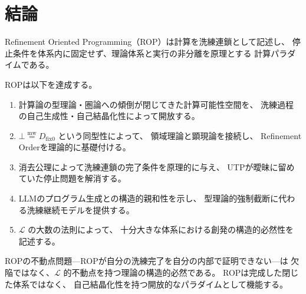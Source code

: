 \documentclass[11pt,a4paper]{article}
\theoremstyle{definition}
\newcommand{\mweq}{\mathrel{\overset{\mathrm{mw}}{=}}}
\newcommand{\dfix}{D_{\mathrm{fix}0}}
\newcommand{\Lhagma}{\mathcal{L}}
\begin{document}
\section{結論}

Refinement Oriented Programming（ROP）は計算を洗練連鎖として記述し、
停止条件を体系内に固定せず、理論体系と実行の非分離を原理とする
計算パラダイムである。

ROPは以下を達成する。

\begin{enumerate}
  \item 計算論の型理論・圏論への傾倒が閉じてきた計算可能性空間を、
    洗練過程の自己生成性・自己結晶化性によって開放する。
  
  \item $\bot \mweq \dfix$ という同型性によって、
    領域理論と顕現論を接続し、
    Refinement Orderを理論的に基礎付ける。
  
  \item 消去公理によって洗練連鎖の完了条件を原理的に与え、
    UTPが曖昧に留めていた停止問題を解消する。
  
  \item LLMのプログラム生成との構造的親和性を示し、
    型理論的強制截断に代わる洗練継続モデルを提供する。
  
  \item $\Lhagma$ の大数の法則によって、
    十分大きな体系における創発の構造的必然性を記述する。
\end{enumerate}

ROPの不動点問題---ROPが自分の洗練完了を自分の内部で証明できない---は
欠陥ではなく、$\Lhagma$ 的不動点を持つ理論の構造的必然である。
ROPは完成した閉じた体系ではなく、
自己結晶化性を持つ開放的なパラダイムとして機能する。
\end{document}
